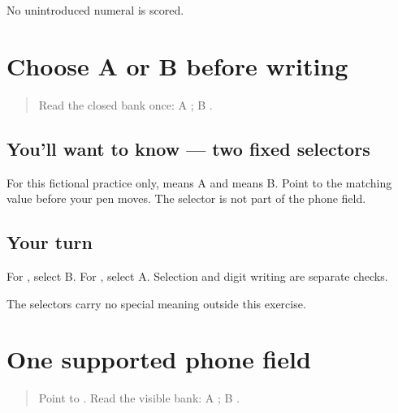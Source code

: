 \begin{tcolorbox}[breakable,colback=teal!4,colframe=teal!35!black,title={Before you move on}]
No unintroduced numeral is scored.
\end{tcolorbox}
\section[\texorpdfstring{\pa{ਕ} / \pa{ਖ} (two target-script selectors)}{ਕ / ਖ (two target-script selectors)}]{Choose A or B before writing}

\label{lesson:PA-W08-phone-select}



\begin{quote}
Read the closed bank once: A \textbf{}; B \textbf{}.
\end{quote}

\subsection*{You'll want to know — two fixed selectors}
For this fictional practice only, \textbf{} means A and \textbf{} means B. Point to the matching value before your pen moves. The selector is not part of the phone field.

\subsection*{Your turn}
For \textbf{}, select B. For \textbf{}, select A. Selection and digit writing are separate checks.

\begin{tcolorbox}[breakable,colback=teal!4,colframe=teal!35!black,title={Before you move on}]
The selectors carry no special meaning outside this exercise.
\end{tcolorbox}
\section[\texorpdfstring{\pa{ਫ਼ੋਨ}: \_\_\_\_\_\_\_\_\_\_ (phone field)}{ਫ਼ੋਨ: \_\_\_\_\_\_\_\_\_\_ (phone field)}]{One supported phone field}

\label{lesson:PA-W08-phone-supported}



\begin{quote}
Point to \textbf{}. Read the visible bank: A \textbf{}; B \textbf{}.
\end{quote}


